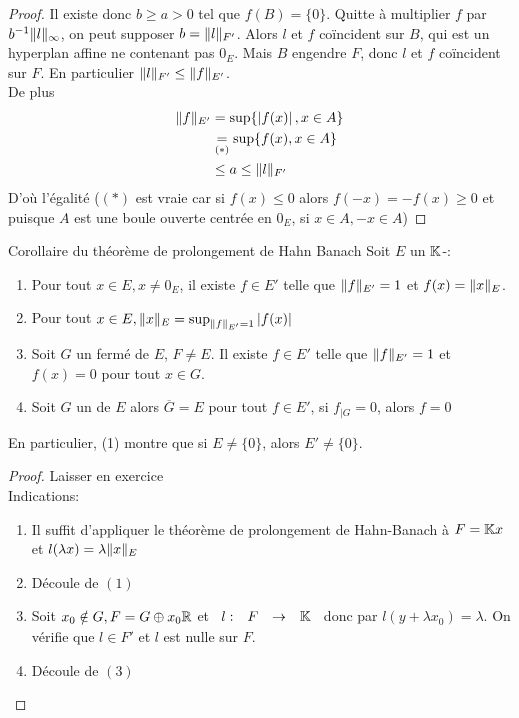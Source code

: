 \documentclass[]{report}
\begin{document}
\begin{proof}
        Il existe donc $b\ge a>0$ tel que $f(B)=\{0\}$. Quitte à multiplier $f$ par $b^{-1}\lVert l \rVert_\infty$, on peut supposer $b=\lVert l \rVert_{F'}$. Alors $l$ et $f$ coïncident sur $B$, qui est un hyperplan affine ne contenant pas $0_E$. Mais $B$ engendre $F$, donc $l$ et $f$ coïncident sur $F$. En particulier $\lVert l \rVert_{F'}\le \lVert f \rVert_{E'}$.\\
        De plus
        \begin{align*}
            \lVert f \rVert_{E'}&=\sup\{\left|f(x)\right|,x\in A\}\\
            &\underset{(*)}{=}\sup \{f(x),x\in A\}\\
            &\le a \le \lVert l \rVert_{F'}
        \end{align*}
        D'où l'égalité ($(*)$ est vraie car si $f(x)\le 0$ alors $f(-x)=-f(x)\ge 0$ et puisque $A$ est une boule ouverte centrée en $0_E$, si $x\in A,-x\in A$)
    \end{proof}

    \begin{cor}{Corollaire du théorème de prolongement de Hahn Banach}{}
        Soit $E$ un $\mathbb{K}$-\evn:
        \begin{enumerate}
            \item Pour tout $x\in E,x\neq 0_E$, il existe $f\in E'$ telle que $\lVert f \rVert_{E'}=1$ et $f(x)=\lVert x \rVert_E$.
            \item Pour tout $x\in E,\lVert x \rVert_E=\sup_{\lVert f \rVert_{E'}=1}|f(x)|$
            \item Soit $G$ un \sev fermé de $E$, $F\neq E$. Il existe $f\in E'$ telle que $\lVert f \rVert_{E'}=1$ et $f(x)=0$ pour tout $x\in G$.
            \item Soit $G$ un \sev de $E$ alors $\overline{G}=E$ \ssi pour tout $f\in E'$, si $f_{|G}=0$, alors $f=0$
        \end{enumerate}
    \end{cor}

    \begin{re}{}{}
        En particulier, (1) montre que si $E\neq \{0\}$, alors $E'\neq \{0\}$.
    \end{re}

    \begin{proof}
        Laisser en exercice\\
        Indications: 
        \begin{enumerate}
            \item Il suffit d'appliquer le théorème de prolongement de Hahn-Banach à $F=\mathbb{K} x$ et $ l(\lambda x)=\lambda \lVert x \rVert_E$
            \item Découle de $(1)$
            \item Soit $x_0\notin G,F=G\oplus x_0 \mathbb{R}$ et $\begin{array}{ccccc} l : & F & \to & \mathbb{K} \end{array}$ donc par $l(y+\lambda x_0)=\lambda$. On vérifie que $l\in F'$ et $l$ est nulle sur $F$.
            \item Découle de $(3)$
        \end{enumerate}
    \end{proof}
\end{document}
